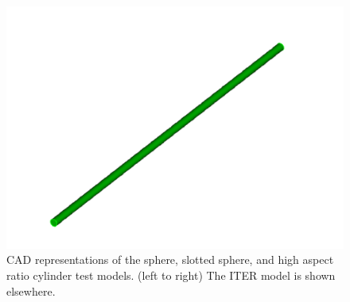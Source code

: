 \documentclass[12pt, a4paper]{article}
\begin{document}
\begin{figure}
\begin{center}
    \includegraphics[scale=0.1]{larcyl.png}
    \caption{CAD representations of the sphere, slotted sphere, and high aspect ratio cylinder test models. (left to right) The ITER model is shown elsewhere. \label{models}}

  \end{center}
\vspace{-0.3cm}

\end{figure} 
\end{document}
